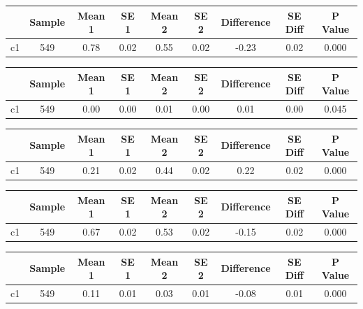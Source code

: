 {
\def\sym#1{\ifmmode^{#1}\else\(^{#1}\)\fi}
\begin{tabular}{l*{1}{cccccccc}}
\hline\hline
            &      Sample&      Mean 1&        SE 1&      Mean 2&        SE 2&  Difference&     SE Diff&     P Value\\
\hline
c1          &         549&        0.78&        0.02&        0.55&        0.02&       -0.23&        0.02&       0.000\\
\hline\hline
\end{tabular}
}
{
\def\sym#1{\ifmmode^{#1}\else\(^{#1}\)\fi}
\begin{tabular}{l*{1}{cccccccc}}
\hline\hline
            &      Sample&      Mean 1&        SE 1&      Mean 2&        SE 2&  Difference&     SE Diff&     P Value\\
\hline
c1          &         549&        0.00&        0.00&        0.01&        0.00&        0.01&        0.00&       0.045\\
\hline\hline
\end{tabular}
}
{
\def\sym#1{\ifmmode^{#1}\else\(^{#1}\)\fi}
\begin{tabular}{l*{1}{cccccccc}}
\hline\hline
            &      Sample&      Mean 1&        SE 1&      Mean 2&        SE 2&  Difference&     SE Diff&     P Value\\
\hline
c1          &         549&        0.21&        0.02&        0.44&        0.02&        0.22&        0.02&       0.000\\
\hline\hline
\end{tabular}
}
{
\def\sym#1{\ifmmode^{#1}\else\(^{#1}\)\fi}
\begin{tabular}{l*{1}{cccccccc}}
\hline\hline
            &      Sample&      Mean 1&        SE 1&      Mean 2&        SE 2&  Difference&     SE Diff&     P Value\\
\hline
c1          &         549&        0.67&        0.02&        0.53&        0.02&       -0.15&        0.02&       0.000\\
\hline\hline
\end{tabular}
}
{
\def\sym#1{\ifmmode^{#1}\else\(^{#1}\)\fi}
\begin{tabular}{l*{1}{cccccccc}}
\hline\hline
            &      Sample&      Mean 1&        SE 1&      Mean 2&        SE 2&  Difference&     SE Diff&     P Value\\
\hline
c1          &         549&        0.11&        0.01&        0.03&        0.01&       -0.08&        0.01&       0.000\\
\hline\hline
\end{tabular}
}
